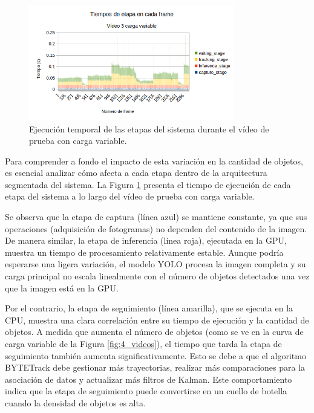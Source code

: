 \documentclass[11pt,spanish,listoffigures,listoftables]{tfgetsinf}
\begin{document}
\begin{figure}[H]
   \centering
   \includegraphics[width=0.8\textwidth]{images/analisis_de_la_solucion/tiempos_etapa.png}
   \caption[Ejecución temporal de las etapas del sistema durante el vídeo de prueba con carga variable]{Ejecución temporal de las etapas del sistema durante el vídeo de prueba con carga variable.}
   \label{fig:tiempos_etapa}
\end{figure}

Para comprender a fondo el impacto de esta variación en la cantidad de objetos, es esencial analizar cómo afecta a cada etapa dentro de la arquitectura segmentada del sistema. La Figura \ref{fig:tiempos_etapa} presenta el tiempo de ejecución de cada etapa del sistema a lo largo del vídeo de prueba con carga variable.

Se observa que la etapa de captura (línea azul) se mantiene constante, ya que sus operaciones (adquisición de fotogramas) no dependen del contenido de la imagen. De manera similar, la etapa de inferencia (línea roja), ejecutada en la GPU, muestra un tiempo de procesamiento relativamente estable. Aunque podría esperarse una ligera variación, el modelo YOLO procesa la imagen completa y su carga principal no escala linealmente con el número de objetos detectados una vez que la imagen está en la GPU.

Por el contrario, la etapa de seguimiento (línea amarilla), que se ejecuta en la CPU, muestra una clara correlación entre su tiempo de ejecución y la cantidad de objetos. A medida que aumenta el número de objetos (como se ve en la curva de carga variable de la Figura \ref{fig:4_videos}), el tiempo que tarda la etapa de seguimiento también aumenta significativamente. Esto se debe a que el algoritmo BYTETrack debe gestionar más trayectorias, realizar más comparaciones para la asociación de datos y actualizar más filtros de Kalman. Este comportamiento indica que la etapa de seguimiento puede convertirse en un cuello de botella cuando la densidad de objetos es alta.
\end{document}
